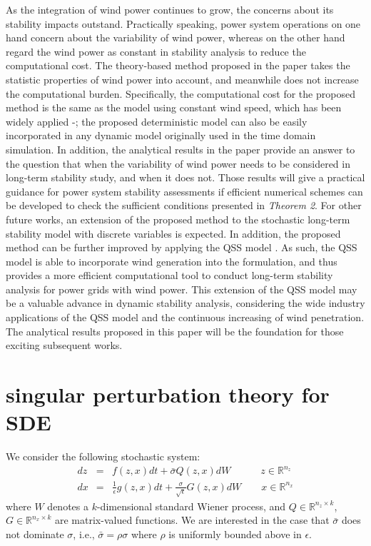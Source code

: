 \documentclass[journal]{IEEEtran}
\newcommand{\ee}{\epsilon}
\begin{document}
As the integration of wind power continues to grow, the concerns about its stability impacts outstand. Practically speaking, power system operations on one hand concern about the variability of wind power, whereas on the other hand regard the wind power as constant in stability analysis to reduce the computational cost. The theory-based method proposed in the paper takes the statistic properties of wind power into account, and meanwhile does not increase the computational burden. Specifically, the computational cost for the proposed method is the same as the model using constant wind speed, which has been widely applied \cite{Vieira:2015}-\cite{Loparo:2011}; the proposed deterministic model can also be easily incorporated in any dynamic model originally used in the time domain simulation. In addition, the analytical results in the paper provide an answer to the question that when the variability of wind power needs to be considered in long-term stability study, and when it does not. Those results will give a practical guidance for power system stability assessments if efficient numerical schemes can be developed to check the sufficient conditions presented in \textit{Theorem 2}. For other future works, an extension of the proposed method to the stochastic long-term stability model with discrete variables is expected. In addition, the proposed method can be further improved by applying the QSS model \cite{Cutsem:book}\cite{Cutsem:article2000}. As such, the QSS model is able to incorporate wind generation into the formulation, and thus provides a more efficient computational tool to conduct long-term stability analysis for power grids with wind power.
This extension of the QSS model may be a valuable advance in dynamic stability analysis, considering the wide industry applications of the QSS model and the continuous increasing of wind penetration. The analytical results proposed in this paper will be the foundation for those exciting subsequent works.







\appendices
\section{singular perturbation theory for SDE}\label{appendix1}
We consider the following stochastic system:
\begin{eqnarray}\label{sto_singular perburbed}
d{z}&=&f(z,x)dt+\bar{\sigma}Q(z,x)dW\qquad\quad z\in\mathbb{R}^{n_z}\\
d{x}&=&\frac{1}{\ee}g(z,x)dt+\frac{\sigma}{\sqrt{\ee}}G(z,x)dW\qquad x\in\mathbb{R}^{n_x}\nonumber
\end{eqnarray}
where $W$ denotes a $k$-dimensional standard Wiener process, and $Q\in \mathbb{R}^{n_z\times k}$, $G\in\mathbb{R}^{n_x\times k}$ are matrix-valued functions. We are interested in the case that $\bar{\sigma}$ does not dominate $\sigma$, i.e., $\bar{\sigma}=\rho \sigma$ where $\rho$ is uniformly bounded above in $\ee$.
\end{document}

